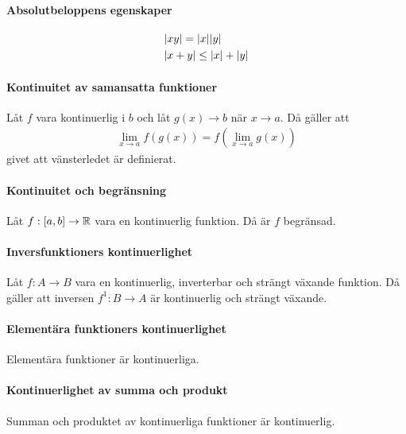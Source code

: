 \paragraph{Absolutbeloppens egenskaper}

\begin{align}
	&\abs{xy} = \abs{x}\abs{y} \label{eq:abs_prod} \\
	&\abs{x + y} \leq \abs{x} + \abs{y} \label{eq:abs_sum}
\end{align}

\proof

\paragraph{Kontinuitet av samansatta funktioner}
Låt $f$ vara kontinuerlig i $b$ och låt $g(x)\to b$ när $x\to a$. Då gäller att
\begin{align*}
	\lim\limits_{x\to a}f(g(x)) = f(\lim\limits_{x\to a}g(x))
\end{align*}
givet att vänsterledet är definierat.

\proof

\paragraph{Kontinuitet och begränsning}\label{par:continuity_limited}
Låt $f: [a,b]\to\mathbb{R}$ vara en kontinuerlig funktion. Då är $f$ begränsad.

\proof

\paragraph{Inversfunktioners kontinuerlighet}
Låt $f: A\to B$ vara en kontinuerlig, inverterbar och strängt växande funktion. Då gäller att inversen $f^{1}: B\to A$ är kontinuerlig och strängt växande.

\proof

\paragraph{Elementära funktioners kontinuerlighet}
Elementära funktioner är kontinuerliga.

\proof

\paragraph{Kontinuerlighet av summa och produkt}
Summan och produktet av kontinuerliga funktioner är kontinuerlig.

